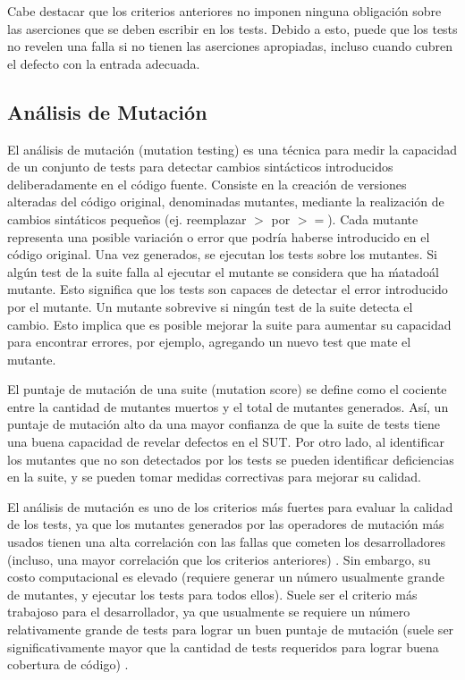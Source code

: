 Cabe destacar que los criterios anteriores no imponen ninguna obligación sobre
las aserciones que se deben escribir en los tests. Debido a esto, puede que los
tests no revelen una falla si no tienen las aserciones apropiadas, incluso
cuando cubren el defecto con la entrada adecuada.  

\subsection{Análisis de Mutación}

El análisis de mutación (mutation testing) es una técnica para medir la
capacidad de un conjunto de tests para detectar cambios sintácticos
introducidos deliberadamente en el código fuente. Consiste en la creación de versiones 
alteradas del código original, denominadas mutantes, mediante la realización de
cambios sintáticos pequeños (ej. reemplazar $>$ por $>=$). Cada mutante representa una 
posible variación o error que podría haberse introducido en el código original.
Una vez generados, se ejecutan los tests sobre los mutantes. 
Si algún test de la suite falla al ejecutar el mutante se considera que ha
\'matado\' al mutante. Esto significa que los tests son capaces de detectar el error 
introducido por el mutante. Un mutante sobrevive si ningún test de la suite 
detecta el cambio. Esto implica que es posible mejorar la suite para aumentar su capacidad 
para encontrar errores, por ejemplo, agregando un nuevo test que mate el mutante.

El puntaje de mutación de una suite (mutation score) se define como
el cociente entre la cantidad de mutantes muertos y el total de mutantes
generados. Así, un puntaje de mutación alto da una mayor confianza de que la suite 
de tests tiene una buena capacidad de revelar defectos en el SUT. 
Por otro lado, al identificar los mutantes que no son detectados por los tests 
se pueden identificar deficiencias en la suite, y se pueden tomar medidas 
correctivas para mejorar su calidad.

El análisis de mutación es uno de los criterios más fuertes para evaluar la 
calidad de los tests, ya que los mutantes generados por las operadores de 
mutación más usados 
tienen una alta correlación con las fallas que cometen los desarrolladores 
(incluso, una mayor correlación que los criterios anteriores) \cite{just2014mutants}. Sin
embargo, su costo computacional es elevado (requiere generar un
número usualmente grande de mutantes, y ejecutar los tests para todos ellos). 
Suele ser el criterio más trabajoso para el desarrollador, ya que usualmente 
se requiere un número relativamente grande de tests para lograr un buen puntaje 
de mutación (suele ser significativamente mayor que la cantidad de tests
    requeridos para lograr buena cobertura de código) \cite{papadakis2019}.

